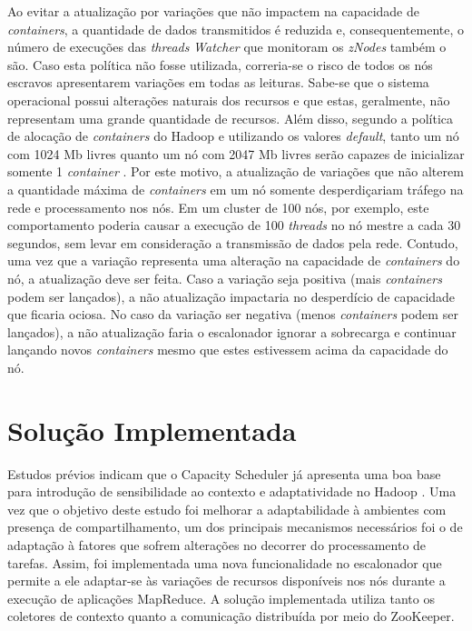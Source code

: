 Ao evitar a atualização por variações que não impactem na capacidade de \textit{containers}, a quantidade de dados transmitidos é reduzida e, consequentemente, o número de execuções das \textit{threads} \textit{Watcher} que monitoram os \textit{zNodes} também o são. Caso esta política não fosse utilizada, correria-se o risco de todos os nós escravos apresentarem variações em todas as leituras. Sabe-se que o sistema operacional possui alterações naturais dos recursos e que estas, geralmente, não representam uma grande quantidade de recursos. Além disso, segundo a política de alocação de \textit{containers} do Hadoop e utilizando os valores \textit{default}, tanto um nó com 1024 Mb livres quanto um nó com 2047 Mb livres serão capazes de inicializar somente 1 \textit{container} \cite{tg}. Por este motivo, a atualização de variações que não alterem a quantidade máxima de \textit{containers} em um nó somente desperdiçariam tráfego na rede e processamento nos nós. Em um cluster de 100 nós, por exemplo, este comportamento poderia causar a execução de 100 \textit{threads} no nó mestre a cada 30 segundos, sem levar em consideração a transmissão de dados pela rede. Contudo, uma vez que a variação representa uma alteração na capacidade de \textit{containers} do nó, a atualização deve ser feita. Caso a variação seja positiva (mais \textit{containers} podem ser lançados), a não atualização impactaria no desperdício de capacidade que ficaria ociosa. No caso da variação ser negativa (menos \textit{containers} podem ser lançados), a não atualização faria o escalonador ignorar a sobrecarga e continuar lançando novos \textit{containers} mesmo que estes estivessem acima da capacidade do nó.

\section{Solução Implementada}
\label{sec:solucao}
Estudos prévios indicam que o Capacity Scheduler já apresenta uma boa base para introdução de sensibilidade ao contexto e adaptatividade no Hadoop \cite{tg}. Uma vez que o objetivo deste estudo foi melhorar a adaptabilidade à ambientes com presença de compartilhamento, um dos principais mecanismos necessários foi o de adaptação à fatores que sofrem alterações no decorrer do processamento de tarefas. Assim, foi implementada uma nova funcionalidade no escalonador que permite a ele adaptar-se às variações de recursos disponíveis nos nós durante a execução de aplicações MapReduce. A solução implementada utiliza tanto os coletores de contexto quanto a comunicação distribuída por meio do ZooKeeper.

